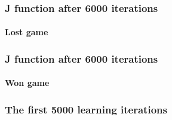 \documentclass[10pt]{beamer}
\begin{document}
\begin{frame}
  \frametitle{J function after 6000 iterations}
  \framesubtitle{Lost game}
  \begin{center}  \end{center}
\end{frame}

\begin{frame}
  \frametitle{J function after 6000 iterations}
  \framesubtitle{Won game}
  \begin{center}  \end{center}
\end{frame}

\begin{frame}
  \frametitle{The first 5000 learning iterations}
  \begin{center}  \end{center}
\end{frame}
\end{document}
